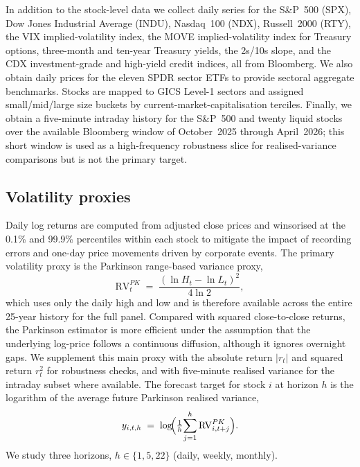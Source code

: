 \documentclass[11pt,a4paper]{article}
\newcommand{\RVPK}{\mathrm{RV}^{PK}}
\begin{document}
In addition to the stock-level data we collect daily series for the
S\&P~500 (SPX), Dow Jones Industrial Average (INDU), Nasdaq~100 (NDX),
Russell~2000 (RTY), the VIX implied-volatility index, the MOVE
implied-volatility index for Treasury options, three-month and ten-year
Treasury yields, the 2s/10s slope, and the CDX investment-grade and
high-yield credit indices, all from Bloomberg. We also obtain daily
prices for the eleven SPDR sector ETFs to provide sectoral aggregate
benchmarks. Stocks are mapped to GICS Level-1 sectors and assigned
small/mid/large size buckets by current-market-capitalisation terciles.
Finally, we obtain a five-minute intraday history for the S\&P~500 and
twenty liquid stocks over the available Bloomberg window of October~2025
through April~2026; this short window is used as a high-frequency
robustness slice for realised-variance comparisons but is not the primary
target.

\subsection{Volatility proxies}

Daily log returns are computed from adjusted close prices and winsorised
at the 0.1\% and 99.9\% percentiles within each stock to mitigate the
impact of recording errors and one-day price movements driven by
corporate events. The primary volatility proxy is the Parkinson
range-based variance proxy,
\begin{equation}
  \RVPK_t \;=\; \frac{(\ln H_t - \ln L_t)^2}{4\ln 2},
  \label{eq:parkinson}
\end{equation}
which uses only the daily high and low and is therefore available across
the entire 25-year history for the full panel. Compared with squared
close-to-close returns, the Parkinson estimator is more efficient under
the assumption that the underlying log-price follows a continuous
diffusion, although it ignores overnight gaps. We supplement this main
proxy with the absolute return $|r_t|$ and squared return $r_t^2$ for
robustness checks, and with five-minute realised variance for the
intraday subset where available. The forecast target for stock $i$ at
horizon $h$ is the logarithm of the average future Parkinson realised
variance,
\begin{equation}
  y_{i,t,h} \;=\; \log\!\Bigl(\tfrac{1}{h}\!\sum_{j=1}^{h}
  \RVPK_{i,t+j}\Bigr).
\end{equation}
We study three horizons, $h\in\{1,5,22\}$ (daily, weekly, monthly).
\end{document}
